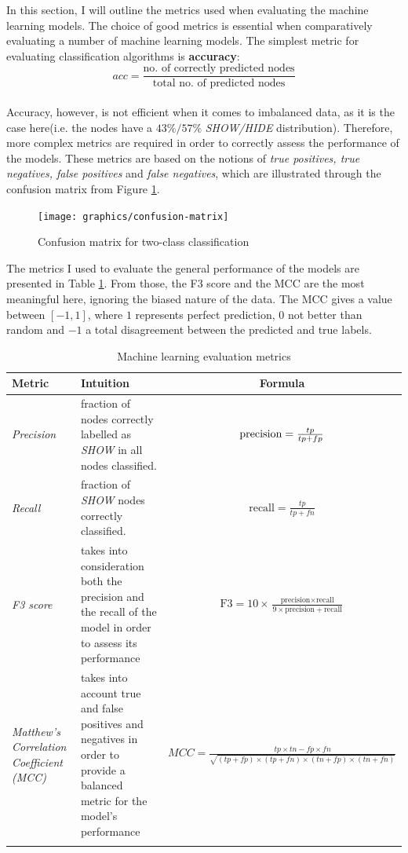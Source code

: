		In this section, I will outline the metrics used when evaluating the machine learning models. The choice of good metrics is essential when comparatively evaluating a number of machine learning models. The simplest metric for evaluating classification algorithms is \textbf{accuracy}: 
		\\
		\begin{equation}
			acc = \frac{\text{no. of correctly predicted nodes}}{\text{total no. of predicted nodes}}
		\end{equation}
		\\
		Accuracy, however, is not efficient when it comes to imbalanced data, as it is the case here(i.e. the nodes have a $43\%/57\%$ \textit{SHOW/HIDE} distribution). Therefore, more complex metrics are required in order to correctly assess the performance of the models. These metrics are based on the notions of \textit{true positives, true negatives, false positives} and \textit{false negatives}, which are illustrated through the confusion matrix from Figure \ref{Fig: eval/ml/metrics/confusion-matrix}.
		\begin{figure}[H]
			\centering
			\texttt{[image: graphics/confusion-matrix]}
			\caption{Confusion matrix for two-class classification}
			\label{Fig: eval/ml/metrics/confusion-matrix}
		\end{figure}
		The metrics I used to evaluate the general performance of the models are presented in Table \ref{Table: eval/ml/metrics/metrics}. From those, the F3 score and the MCC are the most meaningful here, ignoring the biased nature of the data. The MCC gives a value between $[-1, 1]$, where $1$ represents perfect prediction, $0$ not better than random and $-1$ a total disagreement between the predicted and true labels.
		\begin{longtable}{|p{}|p{}|c|}
		   \textbf{Metric} & \textbf{Intuition} &\textbf{Formula} \\
			\hline
			\textit{Precision} & fraction of nodes correctly labelled as \textit{SHOW} in all nodes classified. & {$\centering \text{precision} = \frac{tp}{tp+fp}$} \\
			\hline 
			\textit{Recall} & fraction of \textit{SHOW} nodes correctly classified. & $\text{recall} = \frac{tp}{tp+fn}$ \\
			\hline
			\textit{F3 score} & takes into consideration both the precision and the recall of the model in order to assess its performance & $\text{F3} = 10\times\frac{\text{precision}\times\text{recall}}{9\times\text{precision} + \text{recall}}$\\
			\hline 
			\textit{Matthew's Correlation Coefficient (MCC)} & takes into account true and false positives and negatives in order to provide a balanced metric for the model's performance & $MCC = \frac{tp\times tn - fp\times fn}{\sqrt{(tp+fp)\times(tp+fn)\times(tn+fp)\times(tn+fn)}}$\\
			\hline
			\caption{Machine learning evaluation metrics}
			\label{Table: eval/ml/metrics/metrics}
		\end{longtable}
		

